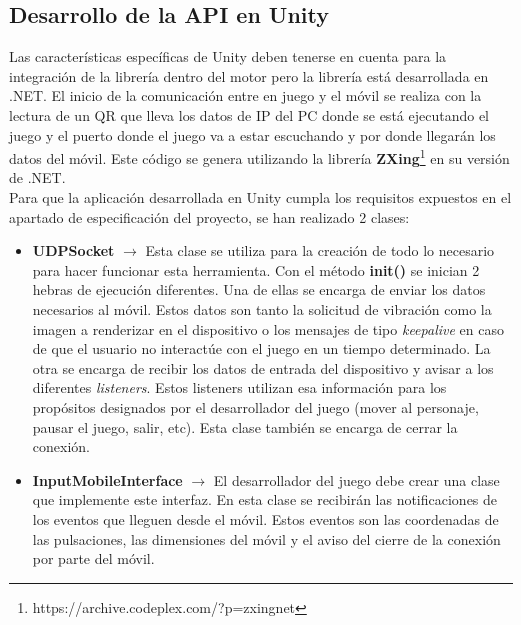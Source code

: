 \subsection {Desarrollo de la API en Unity}

Las caracter\'isticas espec\'ificas de Unity deben tenerse en cuenta para la integraci\'on de la librer\'ia dentro del motor pero la librer\'ia est\'a desarrollada en .NET. El inicio de la comunicaci\'on entre en juego y  el m\'ovil se realiza con la lectura de un QR que lleva los datos de IP del PC donde se est\'a ejecutando el juego y el puerto donde el juego va a estar escuchando y por donde llegar\'an los datos del m\'ovil. Este c\'odigo se genera utilizando la librer\'ia \textbf{ZXing}\footnote{https://archive.codeplex.com/?p=zxingnet} en su versi\'on de .NET. \\

Para que la aplicaci\'on desarrollada en Unity cumpla los requisitos expuestos en el apartado de especificaci\'on del proyecto, se han realizado 2 clases:

\begin {itemize}
\item \textbf{UDPSocket} $\rightarrow$ Esta clase se utiliza para la creaci\'on de todo lo necesario para hacer funcionar esta herramienta. Con el m\'etodo \textbf{init()} se inician 2 hebras de ejecuci\'on diferentes. Una de ellas se encarga de enviar los datos necesarios al m\'ovil. Estos datos son tanto la solicitud de vibraci\'on como la imagen a renderizar en el dispositivo o los mensajes de tipo \textit{keepalive} en caso de que el usuario no interact\'ue con el juego en un tiempo determinado. La otra se encarga de recibir los datos de entrada del dispositivo y avisar a los diferentes \textit{listeners}. Estos listeners utilizan esa informaci\'on para los prop\'ositos designados por el desarrollador del juego (mover al personaje, pausar el juego, salir, etc). Esta clase tambi\'en se encarga de cerrar la conexi\'on.

\item \textbf{InputMobileInterface} $\rightarrow$ El desarrollador del juego debe crear una clase que implemente este interfaz. En esta clase se recibir\'an las notificaciones de los eventos que lleguen desde el m\'ovil. Estos eventos son las coordenadas de las pulsaciones, las dimensiones del m\'ovil y el aviso del cierre de la conexi\'on por parte del m\'ovil.
\end {itemize}

